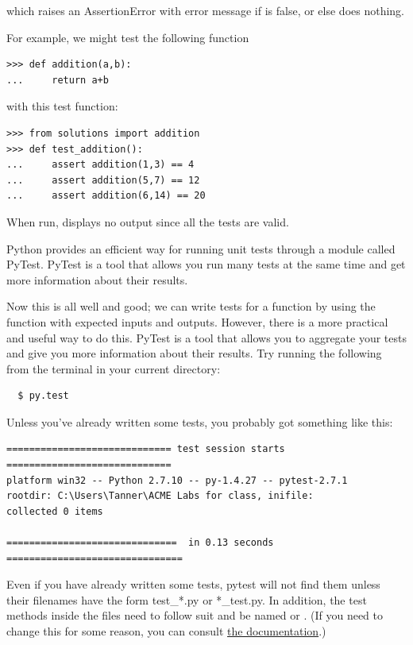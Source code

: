 which raises an AssertionError with error message  if  is false, or else does nothing.

For example, we might test the following function

\begin{lstlisting}
>>> def addition(a,b):
...     return a+b
\end{lstlisting}

with this test function:

\begin{lstlisting}
>>> from solutions import addition
>>> def test_addition():
...     assert addition(1,3) == 4
...     assert addition(5,7) == 12
...     assert addition(6,14) == 20
\end{lstlisting}

When run,  displays no output since all the tests are valid.

Python provides an efficient way for running unit tests through a module called PyTest. PyTest is a tool that allows you run many tests at the same time and get more information about their results.

Now this is all well and good; we can write tests for a function by using the  function with expected inputs and outputs.
However, there is a more practical and useful way to do this.  PyTest is a tool that allows you to aggregate your tests and give you more information about their results.
Try running the following from the terminal in your current directory:

\begin{lstlisting}
  $ py.test
\end{lstlisting}

Unless you've already written some tests, you probably got something like this:

\begin{lstlisting}
============================= test session starts =============================
platform win32 -- Python 2.7.10 -- py-1.4.27 -- pytest-2.7.1
rootdir: C:\Users\Tanner\ACME Labs for class, inifile:
collected 0 items

==============================  in 0.13 seconds ===============================
\end{lstlisting}


Even if you have already written some tests, pytest will not find them unless their filenames have the form test\_*.py or *\_test.py.  In addition, the test methods inside the files need to follow suit and be named  or .  (If you need to change this for some reason, you can consult \href{http://pytest.org/latest/example/pythoncollection.html} {the documentation}.)


